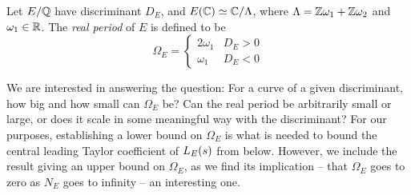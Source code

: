 \begin{definition}\label{defn:real_period}
Let $E/\mathbb{Q}$ have discriminant $D_E$, and $E(\mathbb{C}) \simeq \mathbb{C}/\Lambda$, where $\Lambda = \mathbb{Z}\omega_1 + \mathbb{Z}\omega_2$ and $\omega_1 \in \mathbb{R}$. The {\it real period} of $E$ is defined to be
\begin{equation}
\Omega_E = \begin{cases} 2\omega_1 & D_E > 0 \\ \omega_1 & D_E < 0 \end{cases}
\end{equation}
\end{definition}

We are interested in answering the question: For a curve of a given discriminant, how big and how small can $\Omega_E$ be? Can the real period be arbitrarily small or large, or does it scale in some meaningful way with the discriminant? For our purposes, establishing a lower bound on $\Omega_E$ is what is needed to bound the central leading Taylor coefficient of $L_E(s)$ from below. However, we include the result giving an upper bound on $\Omega_E$, as we find its implication -- that $\Omega_E$ goes to zero as $N_E$ goes to infinity -- an interesting one. \\

